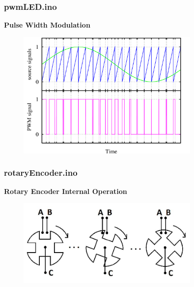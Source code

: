 \documentclass[t]{beamer}
\begin{document}
\begin{frame}[t]
\frametitle{pwmLED.ino}
\textbf{Pulse Width Modulation}

\begin{figure}
	\includegraphics[width=0.8\textwidth]{pwm_wave.png}
\end{figure}


\end{frame}


\begin{frame}[t,fragile]
\frametitle{rotaryEncoder.ino}
\textbf{Rotary Encoder Internal Operation}

\begin{figure}
	\includegraphics[width=0.8\textwidth]{encoderInternals.jpg}
\end{figure}


\end{frame}


\end{document}
